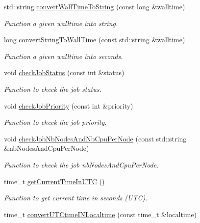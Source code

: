 \begin{DoxyCompactItemize}
std::string \hyperlink{namespacevishnu_ad5bea19658f717e721e13dacad591b2a}{convertWallTimeToString} (const long \&walltime)
\begin{DoxyCompactList}\small\item\em Function a given walltime into string. \item\end{DoxyCompactList}\item 
long \hyperlink{namespacevishnu_aed3383125fa0df584941fc4dac560e9e}{convertStringToWallTime} (const std::string \&walltime)
\begin{DoxyCompactList}\small\item\em Function a given walltime into seconds. \item\end{DoxyCompactList}\item 
void \hyperlink{namespacevishnu_a8460fc46c76d0b8e7efedbc571487d1f}{checkJobStatus} (const int \&status)
\begin{DoxyCompactList}\small\item\em Function to check the job status. \item\end{DoxyCompactList}\item 
void \hyperlink{namespacevishnu_aa59f3181383172b450f3621192c3ad26}{checkJobPriority} (const int \&priority)
\begin{DoxyCompactList}\small\item\em Function to check the job priority. \item\end{DoxyCompactList}\item 
void \hyperlink{namespacevishnu_a66c4f962fb018f2e5e89d81f06357ca3}{checkJobNbNodesAndNbCpuPerNode} (const std::string \&nbNodesAndCpuPerNode)
\begin{DoxyCompactList}\small\item\em Function to check the job nbNodesAndCpuPerNode. \item\end{DoxyCompactList}\item 
time\_\-t \hyperlink{namespacevishnu_a34810356a494e9db0e924c76889474b0}{getCurrentTimeInUTC} ()
\begin{DoxyCompactList}\small\item\em Function to get current time in seconds (UTC). \item\end{DoxyCompactList}\item 
time\_\-t \hyperlink{namespacevishnu_a912b9d87fc92812a07bb7f6dce8dcb85}{convertUTCtimeINLocaltime} (const time\_\-t \&localtime)

\end{DoxyCompactItemize}
